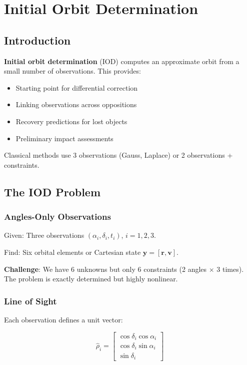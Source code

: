 \chapter{Initial Orbit Determination}
\label{ch:initial_orbit}

\section{Introduction}

\textbf{Initial orbit determination} (IOD) computes an approximate orbit from a small number of observations. This provides:
\begin{itemize}
    \item Starting point for differential correction
    \item Linking observations across oppositions
    \item Recovery predictions for lost objects
    \item Preliminary impact assessments
\end{itemize}

Classical methods use 3 observations (Gauss, Laplace) or 2 observations + constraints.

\section{The IOD Problem}

\subsection{Angles-Only Observations}

Given: Three observations $(\alpha_i, \delta_i, t_i)$, $i = 1, 2, 3$.

Find: Six orbital elements or Cartesian state $\mathbf{y} = [\mathbf{r}, \mathbf{v}]$.

\textbf{Challenge}: We have 6 unknowns but only 6 constraints (2 angles $\times$ 3 times). The problem is exactly determined but highly nonlinear.

\subsection{Line of Sight}

Each observation defines a unit vector:

\begin{equation}
    \hat{\rho}_i = \begin{bmatrix} \cos\delta_i \cos\alpha_i \\ \cos\delta_i \sin\alpha_i \\ \sin\delta_i \end{bmatrix}
\end{equation}

